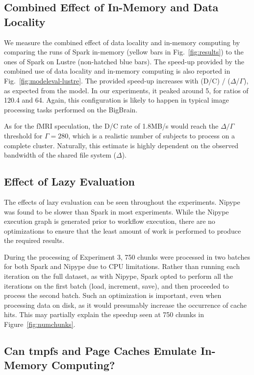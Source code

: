 \documentclass{IEEEtran}
\begin{document}
\subsection{Combined Effect of In-Memory and Data Locality}
We measure the combined effect of data locality and in-memory computing 
by comparing the runs of Spark in-memory (yellow bars in 
Fig.~\ref{fig:results}) to the ones of Spark on Lustre (non-hatched 
blue bars). The speed-up provided by the combined use of data locality 
and in-memory computing is also reported in 
Fig.~\ref{fig:modeleval-lustre}. The provided speed-up increases with 
(D/C) / ($\Delta$/$\Gamma$), as expected from the model. In our 
experiments, it peaked around 5, for ratios of 120.4 and 64. Again, 
this configuration is likely to happen in typical image processing 
tasks performed on the BigBrain.

As for the fMRI speculation, the D/C 
rate of 1.8MB/s would reach the $\Delta/\Gamma$ threshold for 
$\Gamma=280$, which is a realistic number of subjects to process on a 
complete cluster. Naturally, this estimate is highly dependent on the observed bandwidth
of the shared file system ($\Delta$).

\subsection{Effect of Lazy Evaluation}

The effects of lazy evaluation can be seen throughout the experiments. Nipype 
was found to be slower than Spark in most experiments. While the Nipype execution
graph is 
generated prior to workflow execution, there are no optimizations
to ensure that the least amount of work is performed to produce the required 
results. 

During the processing of Experiment 3, 750 chunks were processed in two batches
for both Spark and Nipype due to CPU limitations.
Rather than running each iteration on the full dataset, as with Nipype, 
Spark opted to perform all the iterations on the first batch (load, increment, save),
and then proceeded to process the second batch. Such an optimization is important, 
even when processing data on disk, as it would presumably increase the occurrence
of cache hits. This may partially explain the speedup seen at 750 chunks in
Figure~\ref{fig:numchunks}.%

\subsection{Can tmpfs and Page Caches Emulate In-Memory Computing?}
\end{document}
